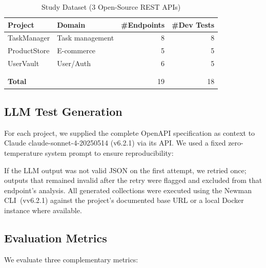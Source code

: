 \documentclass[sigconf,review,anonymous=false]{acmart}
\begin{document}
\begin{table}[t]
  \caption{Study Dataset (3 Open-Source REST APIs)}
  \label{tab:projects}
  \centering
  \small
  \begin{tabular}{llrr}
    \toprule
    \textbf{Project} & \textbf{Domain} & \textbf{\#Endpoints} & \textbf{\#Dev Tests} \\
    \midrule
    TaskManager   & Task management & 8  & 8 \\
    ProductStore  & E-commerce      & 5  & 5 \\
    UserVault     & User/Auth       & 6  & 5 \\
     \\
     \\
    \midrule
    \textbf{Total}    &                           & 19 & 18\\
    \bottomrule
  \end{tabular}
\end{table}

\subsection{LLM Test Generation}
For each project, we supplied the complete OpenAPI specification as context
to Claude claude-sonnet-4-20250514 (v6.2.1) via its API. We used
a fixed zero-temperature system prompt to ensure reproducibility:

\vspace{2pt}
\noindent{}
\vspace{2pt}

If the LLM output was not valid JSON on the first attempt, we retried
once; outputs that remained invalid after the retry were flagged and excluded
from that endpoint's analysis. All generated collections were executed using
the Newman CLI~(vv6.2.1) against the project's documented base URL or
a local Docker instance where available.

\subsection{Evaluation Metrics}
We evaluate three complementary metrics:
\end{document}
